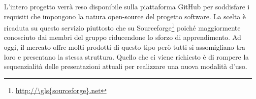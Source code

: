 L’intero progetto verrà reso disponibile sulla piattaforma \gls{GitHub} per soddisfare i requisiti che impongono la natura open-source del progetto software.
La scelta è ricaduta su questo servizio piuttosto che su \gls{Sourceforge}\footnote{\url{http://\gls{sourceforge}.net}} poiché maggiormente conosciuto dai membri del gruppo riducendone lo sforzo di apprendimento.
Ad oggi, il mercato offre molti prodotti di questo tipo però tutti si assomigliano tra loro e presentano la stessa struttura. Quello che ci viene richiesto è di rompere la sequenzialità delle presentazioni attuali per realizzare una nuova modalità d’uso.

